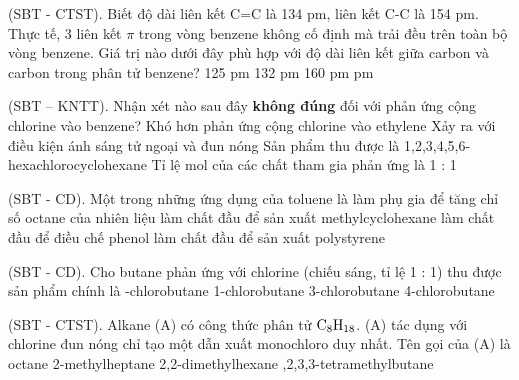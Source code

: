 \documentclass[12pt,a4paper]{article}
\begin{document}
\begin{ex}
(SBT - CTST). Biết độ dài liên kết C=C là 134 pm, liên kết C-C là 154 pm. Thực tế, 3 liên kết $\pi$ trong vòng benzene không cố định mà trải đều trên toàn bộ vòng benzene. Giá trị nào dưới đây phù hợp với độ dài liên kết giữa carbon và carbon trong phân tử benzene?
\choice
{125 pm}
{132 pm}
{160 pm}
{ pm}
\end{ex}

\begin{ex}
(SBT – KNTT). Nhận xét nào sau đây \textbf{không đúng} đối với phản ứng cộng chlorine vào benzene?
\choice
{Khó hơn phản ứng cộng chlorine vào ethylene}
{Xảy ra với điều kiện ánh sáng tử ngoại và đun nóng}
{Sản phẩm thu được là 1,2,3,4,5,6-hexachlorocyclohexane}
{\True Tỉ lệ mol của các chất tham gia phản ứng là 1 : 1}
\end{ex}

\begin{ex}
(SBT - CD). Một trong những ứng dụng của toluene là
\choice
{\True làm phụ gia để tăng chỉ số octane của nhiên liệu}
{làm chất đầu để sản xuất methylcyclohexane}
{làm chất đầu để điều chế phenol}
{làm chất đầu để sản xuất polystyrene}
\end{ex}

\begin{ex}
(SBT - CD). Cho butane phản ứng với chlorine (chiếu sáng, tỉ lệ 1 : 1) thu được sản phẩm chính là
\choice
{-chlorobutane}
{1-chlorobutane}
{3-chlorobutane}
{4-chlorobutane}
\end{ex}

\begin{ex}
(SBT - CTST). Alkane (A) có công thức phân tử $\ce{C8H18}$. (A) tác dụng với chlorine đun nóng chỉ tạo một dẫn xuất monochloro duy nhất. Tên gọi của (A) là
\choice
{octane}
{2-methylheptane}
{2,2-dimethylhexane}
{,2,3,3-tetramethylbutane}
\end{ex}
\end{document}
